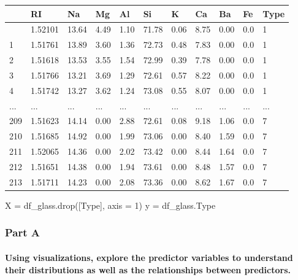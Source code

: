 \documentclass[
  11pt,
]{article}
\let\oldparagraph\paragraph
\renewcommand{\paragraph}[1]{\oldparagraph{#1}\mbox{}}
\newenvironment{Shaded}{\begin{snugshade}}{\end{snugshade}}
\newcommand{\DecValTok}[1]{\textcolor[rgb]{0.68,0.00,0.00}{#1}}
\newcommand{\NormalTok}[1]{\textcolor[rgb]{0.00,0.23,0.31}{#1}}
\newcommand{\OperatorTok}[1]{\textcolor[rgb]{0.37,0.37,0.37}{#1}}
\newcommand{\StringTok}[1]{\textcolor[rgb]{0.13,0.47,0.30}{#1}}
\begin{document}
\begin{longtable}[]{@{}lllllllllll@{}}
\toprule\noalign{}
& RI & Na & Mg & Al & Si & K & Ca & Ba & Fe & Type \\
\midrule\noalign{}
\endhead
\bottomrule\noalign{}
\endlastfoot
0 & 1.52101 & 13.64 & 4.49 & 1.10 & 71.78 & 0.06 & 8.75 & 0.00 & 0.0 &
1 \\
1 & 1.51761 & 13.89 & 3.60 & 1.36 & 72.73 & 0.48 & 7.83 & 0.00 & 0.0 &
1 \\
2 & 1.51618 & 13.53 & 3.55 & 1.54 & 72.99 & 0.39 & 7.78 & 0.00 & 0.0 &
1 \\
3 & 1.51766 & 13.21 & 3.69 & 1.29 & 72.61 & 0.57 & 8.22 & 0.00 & 0.0 &
1 \\
4 & 1.51742 & 13.27 & 3.62 & 1.24 & 73.08 & 0.55 & 8.07 & 0.00 & 0.0 &
1 \\
... & ... & ... & ... & ... & ... & ... & ... & ... & ... & ... \\
209 & 1.51623 & 14.14 & 0.00 & 2.88 & 72.61 & 0.08 & 9.18 & 1.06 & 0.0 &
7 \\
210 & 1.51685 & 14.92 & 0.00 & 1.99 & 73.06 & 0.00 & 8.40 & 1.59 & 0.0 &
7 \\
211 & 1.52065 & 14.36 & 0.00 & 2.02 & 73.42 & 0.00 & 8.44 & 1.64 & 0.0 &
7 \\
212 & 1.51651 & 14.38 & 0.00 & 1.94 & 73.61 & 0.00 & 8.48 & 1.57 & 0.0 &
7 \\
213 & 1.51711 & 14.23 & 0.00 & 2.08 & 73.36 & 0.00 & 8.62 & 1.67 & 0.0 &
7 \\
\end{longtable}

\begin{Shaded}
\begin{Highlighting}[]
\NormalTok{X }\OperatorTok{=}\NormalTok{ df\_glass.drop([}\StringTok{\textquotesingle{}Type\textquotesingle{}}\NormalTok{], axis }\OperatorTok{=} \DecValTok{1}\NormalTok{)}
\NormalTok{y }\OperatorTok{=}\NormalTok{ df\_glass.Type}
\end{Highlighting}
\end{Shaded}

\subsubsection{Part A}\label{part-a}

\paragraph{Using visualizations, explore the predictor variables to
understand their distributions as well as the relationships between
predictors.}\label{using-visualizations-explore-the-predictor-variables-to-understand-their-distributions-as-well-as-the-relationships-between-predictors.}
\end{document}
